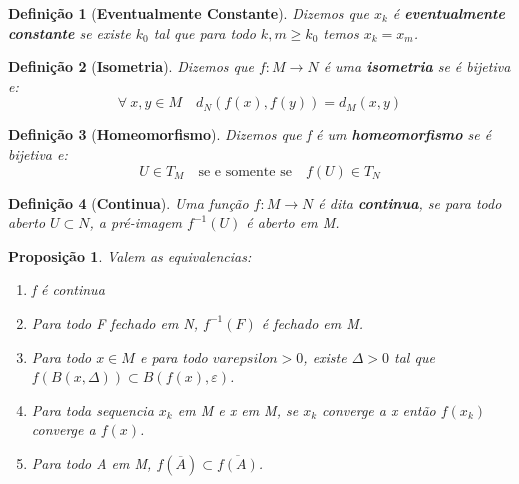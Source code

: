 \documentclass{article}
\newtheorem*{definition}{Definição}
\newtheorem*{proposicao}{Proposição}
\begin{document}
\begin{definition}[\textbf{Eventualmente Constante}]
    Dizemos que $x_k$ é \textbf{eventualmente constante} se existe $k_0$ tal que para todo $k, m \geq k_0$ temos $x_k = x_m$.
\end{definition}

\begin{definition}[\textbf{Isometria}]
    Dizemos que $f: M \rightarrow N$ é uma \textbf{isometria} se é bijetiva e:
    \[\forall \: x, y \in M \quad d_N(f(x), f(y)) = d_M(x, y)\]
\end{definition}

\begin{definition}[\textbf{Homeomorfismo}]
    Dizemos que f é um \textbf{homeomorfismo} se é bijetiva e:
    \[U \in T_M \quad \text{se e somente se} \quad f(U) \in T_N\]
\end{definition}

\begin{definition}[\textbf{Continua}]
    Uma função $f: M \rightarrow N$ é dita \textbf{continua}, se para todo aberto $U \subset N$, a pré-imagem $f^{-1}(U)$ é aberto em M.
\end{definition}

\begin{proposicao}
    Valem as equivalencias:
    \begin{enumerate}
        \item f é continua
        \item Para todo F fechado em N, $f^{-1}(F)$ é fechado em M.
        \item Para todo $x \in M$ e para todo $varepsilon >0$, existe $\varDelta > 0 $ tal que $f(B(x, \varDelta)) \subset B(f(x), \varepsilon)$.
        \item Para toda sequencia $x_k$ em M e x em M, se $x_k$ converge a x então $f(x_k)$ converge a $f(x)$.
        \item Para todo A em M, $f(\overline{A}) \subset \overline{f(A)}$.
    \end{enumerate}
\end{proposicao}
\end{document}
